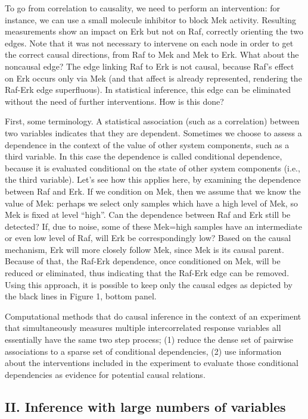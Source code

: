 \documentclass[journal=jacsat,manuscript=article]{achemso}
\begin{document}
To go from correlation to causality, we need to perform an intervention:
for instance, we can use a small molecule inhibitor to block Mek
activity. Resulting measurements show an impact on Erk but not on Raf,
correctly orienting the two edges. Note that it was not necessary to
intervene on each node in order to get the correct causal directions,
from Raf to Mek and Mek to Erk. What about the noncausal edge? The edge
linking Raf to Erk is not causal, because Raf's effect on Erk occurs
only via Mek (and that affect is already represented, rendering the
Raf-Erk edge superfluous). In statistical inference, this edge can be
eliminated without the need of further interventions. How is this done?

First, some terminology. A statistical association (such as a
correlation) between two variables indicates that they are dependent.
Sometimes we choose to assess a dependence in the context of the value
of other system components, such as a third variable. In this case the
dependence is called conditional dependence, because it is evaluated
conditional on the state of other system components (i.e., the third
variable). Let's see how this applies here, by examining the dependence
between Raf and Erk. If we condition on Mek, then we assume that we know
the value of Mek: perhaps we select only samples which have a high level
of Mek, so Mek is fixed at level ``high''. Can the dependence between
Raf and Erk still be detected? If, due to noise, some of these Mek=high
samples have an intermediate or even low level of Raf, will Erk be
correspondingly low? Based on the causal mechanism, Erk will more
closely follow Mek, since Mek is its causal parent. Because of that, the
Raf-Erk dependence, once conditioned on Mek, will be reduced or
eliminated, thus indicating that the Raf-Erk edge can be removed. Using
this approach, it is possible to keep only the causal edges as depicted
by the black lines in Figure 1, bottom panel.

Computational methods that do causal inference in the context of an
experiment that simultaneously measures multiple intercorrelated
response variables all essentially have the same two step process; (1)
reduce the dense set of pairwise associations to a sparse set of
conditional dependencies, (2) use information about the interventions
included in the experiment to evaluate those conditional dependencies as
evidence for potential causal relations.


\subsection{II. Inference with large numbers of variables}
\end{document}
